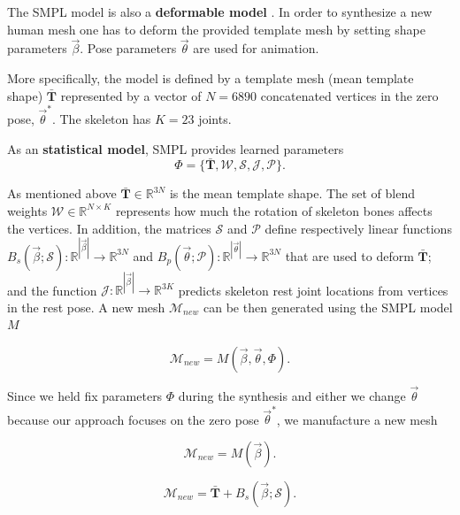 \documentclass[runningheads, orivec]{llncs}
\begin{document}
The SMPL model is also a \textbf{deformable model} 
\cite{Terzopoulos.1987}. In order to 
synthesize a 
new human mesh one has to deform the provided template mesh by 
setting shape parameters $\vec{\beta}$. Pose parameters $\vec{\theta}$ are used 
for animation.

More specifically, the model is defined by a template mesh (mean template 
shape) $\mathbf{\bar{T}}$ represented by a vector of $N = 6890$ concatenated 
vertices in the zero pose, $\vec{\theta}^*$. The skeleton has $K = 23$ joints.

As an \textbf{statistical model}, SMPL provides learned parameters
\begin{equation} \label{eq:smpl_params}
\Phi = \{\mathbf{\bar{T}}, \mathcal{W}, \mathcal{S}, \mathcal{J}, 
\mathcal{P}\}.
\end{equation}

As mentioned above $\mathbf{\bar{T}} \in \mathbb{R}^{3N}$  is the mean template 
shape. The set of blend weights $\mathcal{W} \in \mathbb{R}^{N \times K}$ 
represents 
how much the rotation of 
skeleton bones affects
the vertices. In addition, the matrices $\mathcal{S}$ and $\mathcal{P}$ define 
respectively linear functions $B_s(\vec{\beta}; \mathcal{S}): 
\mathbb{R}^{|\vec{\beta}|} \to 
\mathbb{R}^{3N}$ and $B_p(\vec{\theta}; \mathcal{P}): 
\mathbb{R}^{|\vec{\theta}|} \to 
\mathbb{R}^{3N}$ that are used to deform $\mathbf{\bar{T}}$; and the function 
$\mathcal{J}: \mathbb{R}^{|\vec{\beta}|} \to \mathbb{R}^{3K}$ predicts skeleton 
rest joint locations from vertices in the rest 
pose. A new mesh $\mathcal{M}_{new}$ can be then generated using the SMPL model 
$M$

\begin{equation}\label{eq:gen_mesh}
\mathcal{M}_{new} = M(\vec{\beta}, \vec{\theta}, \Phi).
\end{equation}

Since we held fix parameters $\Phi$ during the synthesis and either we change 
$\vec{\theta}$ because our approach focuses on the zero pose $\vec{\theta}^*$, 
we manufacture a new mesh

\begin{equation}\label{eq:gen_mesh_only_shape}
\mathcal{M}_{new} = M(\vec{\beta}).
\end{equation}

\begin{equation}\label{eq:gen_new_mesh}
\mathcal{M}_{new} = \mathbf{\bar{T}} + B_s(\vec{\beta}; \mathcal{S}).
\end{equation}
\end{document}
